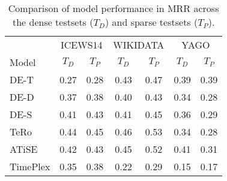 \begin{table}[htb]
\centering
\begin{minipage}{0.95\columnwidth}
\centering
\caption{Comparison of model performance in MRR across the dense testsets ($T_D$) and sparse testsets ($T_P$).}
\vspace{-3mm}

\begin{tabular}{l|cc|cc|cc}\hline
 & \multicolumn{2}{c|}{ICEWS14} & \multicolumn{2}{c|}{WIKIDATA}& \multicolumn{2}{c}{YAGO} \\
Model & $T_D$ & $T_P$ & $T_D$ & $T_P$ & $T_D$ & $T_P$ \\ \hline
DE-T   & 
0.27    & 0.28   &
0.43    & 0.47   &
0.39    & 0.39   \\
DE-D &
0.37    & 0.38   &
0.40    & 0.43   &
0.34    & 0.28   \\
DE-S   &
0.41    & 0.43   &
0.41    & 0.45   &
0.36    & 0.29   \\
TeRo        & 
0.44    & 0.45   &
0.46    & 0.53   &
0.34    & 0.28   \\
ATiSE       & 
0.42    & 0.43   &
0.45    & 0.52   &
0.41    & 0.31   \\
TimePlex    &
0.35    & 0.38   &
0.22    & 0.29   &
0.15    & 0.17   \\ \hline
\end{tabular}

\label{tab:time_density_comparison}
\end{minipage}
\end{table}


